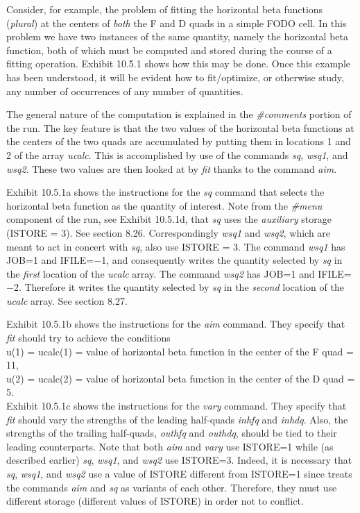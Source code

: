 Consider, for example, the problem of fitting the horizontal beta
functions ({\em plural}) at the centers of {\em both} the F and D quads in a simple
FODO cell.  In this problem we have two instances of the same quantity,
namely the horizontal beta function, both of which must be computed
and stored during the course of a fitting operation.  Exhibit 10.5.1
shows how this may be done.  Once this example has been understood, it
will be evident how to fit/optimize, or otherwise study, any number of
occurrences of any number of quantities.

The general nature of the
computation is explained in the {\em \#comments}
portion of the \Mary run.  The key feature is that the two values of the
horizontal beta functions at the centers of the two quads are accumulated
by putting them in locations 1 and 2 of the array {\em ucalc}.  This is
accomplished by use of the commands {\em sq}, {\em wsq1}, and {\em
wsq2}.  These two values
are then looked at by {\em fit} thanks to the command {\em aim}.

Exhibit 10.5.1a shows the instructions for the {\em sq} command that
selects the horizontal beta function as the quantity of interest.  Note
from the {\em \#menu} component of the \Mary run, see Exhibit 10.5.1d,
that {\em sq} uses the {\em auxiliary} storage (ISTORE = 3).  See section
8.26.  Correspondingly {\em wsq1} and {\em wsq2}, which are meant to act
in concert with {\em sq}, also use ISTORE = 3.  The command {\em wsq1}
has JOB=1 and IFILE=$-$1, and consequently writes the quantity selected
by {\em sq} in the {\em first} location of the {\em ucalc} array.  The command
{\em wsq2} has JOB=1 and IFILE=$-$2.  Therefore it writes the quantity
selected by {\em sq} in the {\em second} location of the {\em ucalc}
array.  See section 8.27.

Exhibit 10.5.1b shows the instructions for the {\em aim} command.  They
specify that {\em fit} should try to achieve the conditions \\

u(1) = ucalc(1) = value of horizontal beta function in the center of the
F quad = 11,\\

u(2) = ucalc(2) = value of horizontal beta function in the center of the
D quad = 5. \\

Exhibit 10.5.1c shows the instructions for the {\em vary} command.  They
specify that {\em fit} should vary the strengths of the leading
half-quads {\em inhfq} and {\em inhdq}.  Also, the strengths of the
trailing half-quads, {\em outhfq} and {\em outhdq}, should be tied to
their leading counterparts.  Note that both {\em aim} and {\em vary} use
ISTORE=1 while (as described earlier) {\em sq}, {\em wsq1}, and {\em
wsq2} use ISTORE=3.  Indeed, it is necessary that {\em sq}, {\em wsq1},
and {\em wsq2} use a value of ISTORE different from ISTORE=1 since \Mary
treats the commands {\em aim} and {\em sq} as variants of each other.
Therefore, they must use different storage (different values of ISTORE) in
order not to conflict.

